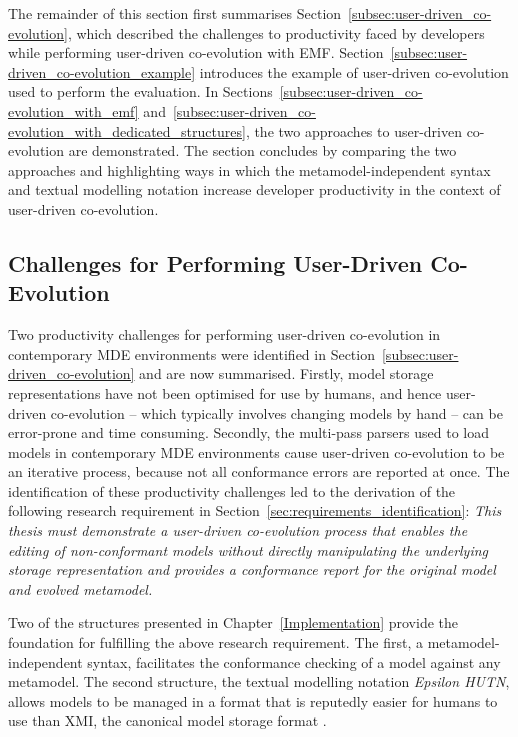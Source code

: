 The remainder of this section first summarises Section~\ref{subsec:user-driven_co-evolution}, which described the challenges to productivity faced by developers while performing user-driven co-evolution with EMF. Section~\ref{subsec:user-driven_co-evolution_example} introduces the example of user-driven co-evolution used to perform the evaluation. In Sections~\ref{subsec:user-driven_co-evolution_with_emf} and~\ref{subsec:user-driven_co-evolution_with_dedicated_structures}, the two approaches to user-driven co-evolution are demonstrated. The section concludes by comparing the two approaches and highlighting ways in which the metamodel-independent syntax and textual modelling notation increase developer productivity in the context of user-driven co-evolution.

\subsection{Challenges for Performing User-Driven Co-Evolution}
Two productivity challenges for performing user-driven co-evolution in contemporary MDE environments were identified in Section~\ref{subsec:user-driven_co-evolution} and are now summarised. Firstly, model storage representations have not been optimised for use by humans, and hence user-driven co-evolution -- which typically involves changing models by hand -- can be error-prone and time consuming. Secondly, the multi-pass parsers used to load models in contemporary MDE environments cause user-driven co-evolution to be an iterative process, because not all conformance errors are reported at once. The identification of these productivity challenges led to the derivation of the following research requirement in Section~\ref{sec:requirements_identification}: \emph{This thesis must demonstrate a user-driven co-evolution process that enables the editing of non-conformant models without directly manipulating the underlying storage representation and provides a conformance report for the original model and evolved metamodel.}

Two of the structures presented in Chapter~\ref{Implementation} provide the foundation for fulfilling the above research requirement. The first, a metamodel-independent syntax, facilitates the conformance checking of a model against any metamodel. The second structure, the textual modelling notation \emph{Epsilon HUTN}, allows models to be managed in a format that is reputedly easier for humans to use than XMI, the canonical model storage format \cite{hutn}.

